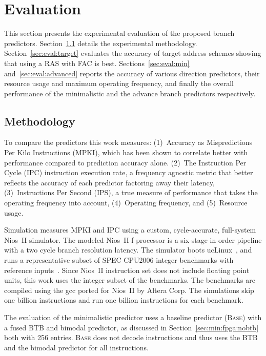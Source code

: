 \chapter{Evaluation}
\label{chap:eval}

This section presents the experimental evaluation of the proposed branch predictors.
Section~\ref{sec:eval:methodology} details the experimental methodology. Section~\ref{sec:eval:target} evaluates the accuracy of target address schemes showing that using a RAS with FAC is best. Sections~\ref{sec:eval:min} and~\ref{sec:eval:advanced} reports the accuracy of various direction predictors, their resource usage and maximum operating frequency, and finally the overall performance of the minimalistic and the advance branch predictors respectively.

\section{Methodology}
\label{sec:eval:methodology}
To compare the predictors this work measures: (1)~Accuracy as Mispredictions Per Kilo Instructions (MPKI), which has been shown to correlate better with performance compared to prediction accuracy alone. (2)~The Instruction Per Cycle (IPC) instruction execution rate, a frequency agnostic metric that better reflects the accuracy of each predictor factoring away their latency, (3)~Instructions Per Second (IPS), a true measure of performance that takes the operating frequency into account, (4)~Operating frequency, and (5)~Resource usage.

Simulation measures MPKI and IPC using a custom, cycle-accurate, full-system Nios~II simulator. The modeled Nios~II-f processor is a six-stage in-order pipeline with a two cycle branch resolution latency. The simulator boots ucLinux~\cite{uclinux}, and runs a representative subset of SPEC CPU2006 integer benchmarks with reference inputs~\cite{spec2k6}. Since Nios~II instruction set does not include floating point units, this work uses the integer subset of the benchmarks. The benchmarks are compiled using the gcc ported for Nios~II by Altera Corp. The simulations skip one billion instructions and run one billion instructions for each benchmark.


The evaluation of the minimalistic predictor uses a baseline predictor (\textsc{Base}) with a fused BTB and bimodal predictor, as discussed in Section~\ref{sec:min:fpga:nobtb} both with 256 entries. \textsc{Base} does not decode instructions and thus uses the BTB and the bimodal predictor for all instructions.

